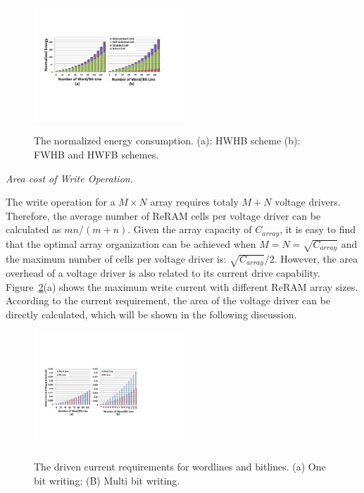 \begin{figure}%
\centering
  \includegraphics[width=0.5\textwidth]{./figures/energy4.pdf}\\
  \caption{The normalized energy consumption. (a): HWHB scheme (b): FWHB and HWFB schemes.}\label{fig:energy}
    \vspace{-10pt}
\end{figure}

\vspace{6pt} \emph{Area cost of Write Operation.} \vspace{6pt}

The write operation for a $M \times N$ array requires totaly $M+N$ voltage drivers. Therefore, the average number of ReRAM cells per voltage driver can be calculated as $mn/(m+n)$. Given the array capacity of $C_{array}$, it is easy to find that the optimal array organization can be achieved when $M=N=\sqrt{C_{array}}$ and the maximum number of cells per voltage driver is: $\sqrt{C_{array}}/2$. However, the area overhead of a voltage driver is also related to its current drive capability. Figure~\ref{fig:drive_i}(a) shows the maximum write current with different ReRAM array sizes. According to the current requirement, the area of the voltage driver can be directly calculated, which will be shown in the following discussion.

\begin{figure}%
\centering
  \includegraphics[width=0.5\textwidth]{./figures/drive_i_double.pdf}\\
  \caption{The driven current requirements for wordlines and bitlines. (a) One bit writing; (B) Multi bit writing.}\label{fig:drive_i}
\end{figure}


